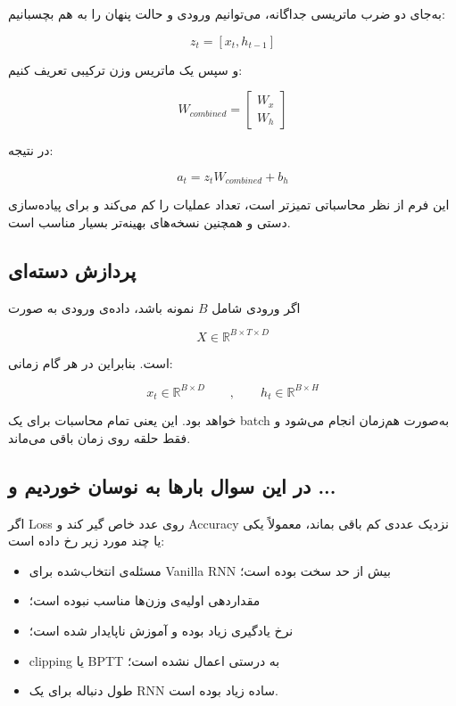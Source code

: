 \documentclass[12pt,a4paper]{article}
\begin{document}
\begin{tcolorbox}[
	colback=softorange,
	colframe=golden,
	title={چرا Concatenation مهم است؟},
	fonttitle=\bfseries
	]
	
	به‌جای دو ضرب ماتریسی جداگانه، می‌توانیم ورودی و حالت پنهان را به هم
	بچسبانیم:
	
	\[
	z_t = [x_t, h_{t-1}]
	\]
	
	و سپس یک ماتریس وزن ترکیبی تعریف کنیم:
	
	\[
	W_{combined} =
	\begin{bmatrix}
		W_x \\
		W_h
	\end{bmatrix}
	\]
	
	در نتیجه:
	
	\[
	a_t = z_t W_{combined} + b_h
	\]
	
	این فرم از نظر محاسباتی تمیزتر است، تعداد عملیات را کم می‌کند و
	برای پیاده‌سازی دستی و همچنین نسخه‌های بهینه‌تر بسیار مناسب است.
\end{tcolorbox}

\subsection{پردازش دسته‌ای}

اگر ورودی شامل \(B\) نمونه باشد، داده‌ی ورودی به صورت

\[
X \in \mathbb{R}^{B \times T \times D}
\]

است. بنابراین در هر گام زمانی:

\[
x_t \in \mathbb{R}^{B \times D}
\qquad,\qquad
h_t \in \mathbb{R}^{B \times H}
\]

خواهد بود. این یعنی تمام محاسبات برای یک batch به‌صورت هم‌زمان انجام می‌شود
و فقط حلقه روی زمان باقی می‌ماند.

\subsection{در این سوال بارها به نوسان خوردیم و ...}

\begin{tcolorbox}[
	colback=softpink,
	colframe=softred,
	title={نکات مهم اجرایی},
	fonttitle=\bfseries
	]
	
	اگر Loss روی عدد خاص گیر کند و Accuracy نزدیک عددی کم باقی بماند، معمولاً
	یکی یا چند مورد زیر رخ داده است:
	\begin{itemize}
		\item مسئله‌ی انتخاب‌شده برای Vanilla RNN بیش از حد سخت بوده است؛
		\item مقداردهی اولیه‌ی وزن‌ها مناسب نبوده است؛
		\item نرخ یادگیری زیاد بوده و آموزش ناپایدار شده است؛
		\item clipping یا BPTT به درستی اعمال نشده است؛
		\item طول دنباله برای یک RNN ساده زیاد بوده است.
		\end{itemize}
	\end{tcolorbox}
\end{document}

